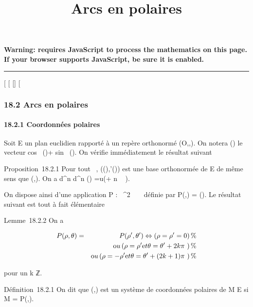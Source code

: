 \documentclass[]{article}
\title{Arcs en polaires}
\author{}
\date{}
\begin{document}
\maketitle

\textbf{Warning: 
requires JavaScript to process the mathematics on this page.\\ If your
browser supports JavaScript, be sure it is enabled.}

\begin{center}\rule{3in}{0.4pt}\end{center}

{[}
{[}
{[}{]}
{[}

\subsubsection{18.2 Arcs en polaires}

\paragraph{18.2.1 Coordonnées polaires}

Soit E un plan euclidien rapporté à un repère orthonormé
(O,\vec\imath,). On notera
\vecu(\theta) le vecteur cos~
(\theta)\vec\imath + sin~
(\theta). On vérifie immédiatement le résultat
suivant

Proposition~18.2.1 Pour tout \theta \in {}~,
(\vecu(\theta),\vecu'(\theta)) est une base
orthonormée de E de même sens que
(\vec\imath,). On a 
d^n \over d\theta^n
\vecu(\theta) =\vec u(\theta + n \pi~
 ).

On dispose ainsi d'une application P : ~^2 \rightarrow~ ~ définie par
P(\rho,\theta) = \rho\vecu(\theta). Le résultat suivant est tout à
fait élémentaire

Lemme~18.2.2 On a

\begin{align*} P(\rho,\theta)& =& P(\rho',\theta')
\Leftrightarrow \left (\rho = \rho' =
0\right ) \%& \\ & &
\text ou \left (\rho =
\rho'\text et \theta = \theta' + 2k\pi~\right ) \%&
\\ & & \text ou
\left (\rho = -\rho'\text et \theta = \theta' + (2k
+ 1)\pi~\right )\%& \\
\end{align*}

pour un k \in ℤ.

Définition~18.2.1 On dit que (\rho,\theta) est un système de coordonnées
polaires de M \in E si M = P(\rho,\theta).
\end{document}

